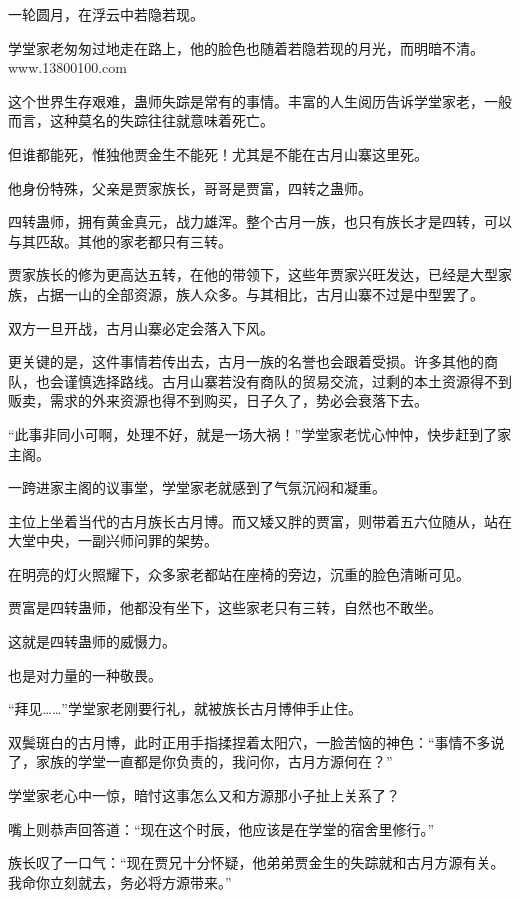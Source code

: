 
\begin{this_body}

一轮圆月，在浮云中若隐若现。

学堂家老匆匆过地走在路上，他的脸色也随着若隐若现的月光，而明暗不清。www.13800100.com

这个世界生存艰难，蛊师失踪是常有的事情。丰富的人生阅历告诉学堂家老，一般而言，这种莫名的失踪往往就意味着死亡。

但谁都能死，惟独他贾金生不能死！尤其是不能在古月山寨这里死。

他身份特殊，父亲是贾家族长，哥哥是贾富，四转之蛊师。

四转蛊师，拥有黄金真元，战力雄浑。整个古月一族，也只有族长才是四转，可以与其匹敌。其他的家老都只有三转。

贾家族长的修为更高达五转，在他的带领下，这些年贾家兴旺发达，已经是大型家族，占据一山的全部资源，族人众多。与其相比，古月山寨不过是中型罢了。

双方一旦开战，古月山寨必定会落入下风。

更关键的是，这件事情若传出去，古月一族的名誉也会跟着受损。许多其他的商队，也会谨慎选择路线。古月山寨若没有商队的贸易交流，过剩的本土资源得不到贩卖，需求的外来资源也得不到购买，日子久了，势必会衰落下去。

“此事非同小可啊，处理不好，就是一场大祸！”学堂家老忧心忡忡，快步赶到了家主阁。

一跨进家主阁的议事堂，学堂家老就感到了气氛沉闷和凝重。

主位上坐着当代的古月族长古月博。而又矮又胖的贾富，则带着五六位随从，站在大堂中央，一副兴师问罪的架势。

在明亮的灯火照耀下，众多家老都站在座椅的旁边，沉重的脸色清晰可见。

贾富是四转蛊师，他都没有坐下，这些家老只有三转，自然也不敢坐。

这就是四转蛊师的威慑力。

也是对力量的一种敬畏。

“拜见……”学堂家老刚要行礼，就被族长古月博伸手止住。

双鬓斑白的古月博，此时正用手指揉捏着太阳穴，一脸苦恼的神色：“事情不多说了，家族的学堂一直都是你负责的，我问你，古月方源何在？”

学堂家老心中一惊，暗忖这事怎么又和方源那小子扯上关系了？

嘴上则恭声回答道：“现在这个时辰，他应该是在学堂的宿舍里修行。”

族长叹了一口气：“现在贾兄十分怀疑，他弟弟贾金生的失踪就和古月方源有关。我命你立刻就去，务必将方源带来。”


\end{this_body}
